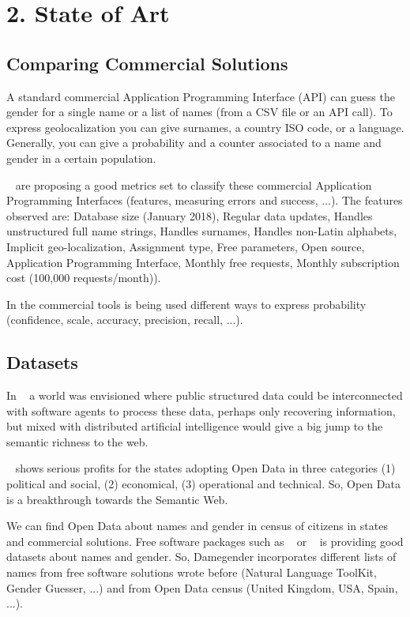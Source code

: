 \documentclass[fleqn,10pt,lineno]{wlpeerj} %
\begin{document}
\section*{2. State of Art}

\subsection*{Comparing Commercial Solutions}

A standard commercial Application Programming Interface (API) can
guess the gender for a single name or a list of names (from a CSV file
or an API call). To express geolocalization you can give surnames, a
country ISO code, or a language. Generally, you can give a probability
and a counter associated to a name and gender in a certain population.

~\cite{10.7717/peerj-cs.156} are proposing a good metrics set to
classify these commercial Application Programming Interfaces (features,
measuring errors and success, ...). The features observed are:
Database size (January 2018), Regular data updates, Handles
unstructured full name strings, Handles surnames, Handles non-Latin
alphabets, Implicit geo-localization, Assignment type, Free
parameters, Open source, Application Programming Interface, Monthly
free requests, Monthly subscription cost (100,000 requests/month)).

In the commercial tools is being used different ways to express
probability (confidence, scale, accuracy, precision, recall, ...).

\subsection*{Datasets}

In ~\cite{berners2001semantic} a world was envisioned where public
structured data could be interconnected with software agents to
process these data, perhaps only recovering information, but mixed
with distributed artificial intelligence would give a big jump to the
semantic richness to the web.

~\cite{janssen2012benefits} shows serious profits for the states
adopting Open Data in three categories (1) political and social, (2)
economical, (3) operational and technical. So, Open Data is a
breakthrough towards the Semantic Web.

We can find Open Data about names and gender in census of citizens in
states and commercial solutions. Free software packages such as
~\cite{krawetz2006gender} or ~\cite{loper2002nltk} is providing good
datasets about names and gender. So, Damegender incorporates different
lists of names from free software solutions wrote before (Natural
Language ToolKit, Gender Guesser, ...) and from Open Data census
(United Kingdom, USA, Spain, ...).
\end{document}
